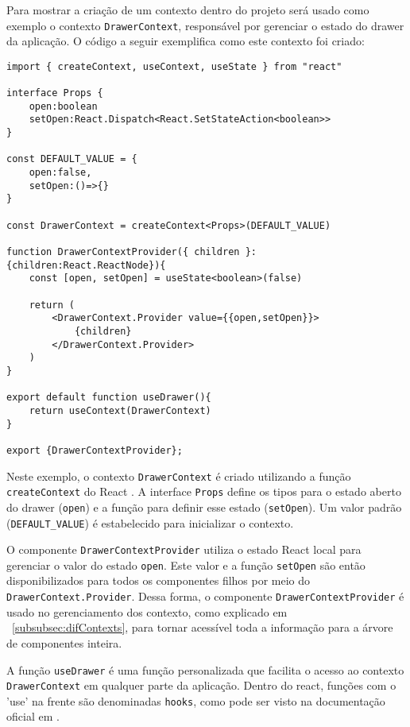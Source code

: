 Para mostrar a criação de um contexto dentro do projeto será usado como exemplo  o contexto \texttt{DrawerContext}, responsável por gerenciar o estado do drawer da aplicação. O código a seguir exemplifica como este contexto foi criado:

\begin{verbatim}
import { createContext, useContext, useState } from "react"

interface Props {
    open:boolean
    setOpen:React.Dispatch<React.SetStateAction<boolean>>
}

const DEFAULT_VALUE = {
    open:false,
    setOpen:()=>{}
}

const DrawerContext = createContext<Props>(DEFAULT_VALUE)

function DrawerContextProvider({ children }:{children:React.ReactNode}){
    const [open, setOpen] = useState<boolean>(false)

    return (
        <DrawerContext.Provider value={{open,setOpen}}>
            {children}
        </DrawerContext.Provider>
    )
}

export default function useDrawer(){
    return useContext(DrawerContext)
}

export {DrawerContextProvider};
\end{verbatim}

Neste exemplo, o contexto \texttt{DrawerContext} é criado utilizando a função \texttt{createContext} do React \cite{reactCreateContext}. A interface \texttt{Props} define os tipos para o estado aberto do drawer (\texttt{open}) e a função para definir esse estado (\texttt{setOpen}). Um valor padrão (\texttt{DEFAULT\_VALUE}) é estabelecido para inicializar o contexto. 

O componente \texttt{DrawerContextProvider} utiliza o estado React local para gerenciar o valor do estado \texttt{open}. Este valor e a função \texttt{setOpen} são então disponibilizados para todos os componentes filhos por meio do \texttt{DrawerContext.Provider}. Dessa forma, o componente \texttt{DrawerContextProvider} é usado no gerenciamento dos contexto, como explicado em ~\ref{subsubsec:difContexts}, para tornar acessível toda a informação para a árvore de componentes inteira.

A função \texttt{useDrawer} é uma função personalizada que facilita o acesso ao contexto \texttt{DrawerContext} em qualquer parte da aplicação. Dentro do react, funções com o 'use' na frente são denominadas \texttt{hooks}, como pode ser visto na documentação oficial em \cite{reactHooksReference}. 

